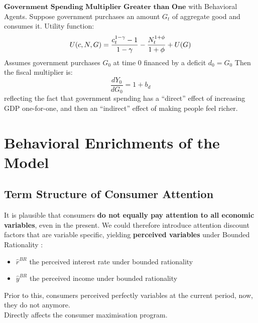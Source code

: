 \documentclass{beamer}
\newcommand\ReduceFont{\fontsize{10}{7.2}\selectfont}
\begin{document}
\begin{frame}{\subsecname}
    $\textbf{Government Spending Multiplier Greater than One}$ with Behavioral Agents. Suppose government purchases an amount $G_{t}$ of aggregate good and consumes it. Utility function:
    \begin{equation}\notag
        U(c,N,G) = \frac{c_{t}^{1-\gamma}-1}{1-\gamma} - \frac{N_{t}^{1+\phi}}{1+\phi}+U(G)
    \end{equation}
    Assumes government purchases $G_{0}$ at time 0 financed by a deficit $d_{0}=G_{0}$
    Then the fiscal multiplier is:
    \begin{equation}
        \frac{d Y_{0}}{d G_{0}}=1+b_{d}
    \end{equation}
    reflecting the fact that government spending has a “direct” effect of increasing GDP one-for-one, and then an “indirect” effect of making people feel richer.
\end{frame}

\section{Behavioral Enrichments of the Model}

\begin{frame}
    \ReduceFont
\end{frame}

\begin{frame}
    \tableofcontents[currentsection, hideothersubsections, sections=\value{section}]
\end{frame}

\subsection{Term Structure of Consumer Attention}
\begin{frame}{\subsecname}
    It is plausible that consumers \textbf{do not equally pay attention to all economic variables}, even in the present. 
    We could therefore introduce attention discount factors that are variable specific, yielding \textbf{perceived variables} under Bounded Rationality : 
    \begin{itemize}
        \item $\hat{r}^{BR}$ the perceived interest rate under bounded rationality
        \item $\hat{y}^{BR}$ the perceived income under bounded rationality
    \end{itemize}
    Prior to this, consumers perceived perfectly variables at the current period, now, they do not anymore. \\
    \hfill \linebreak
    Directly affects the consumer maximisation program. 
\end{frame}
    
\end{document}
